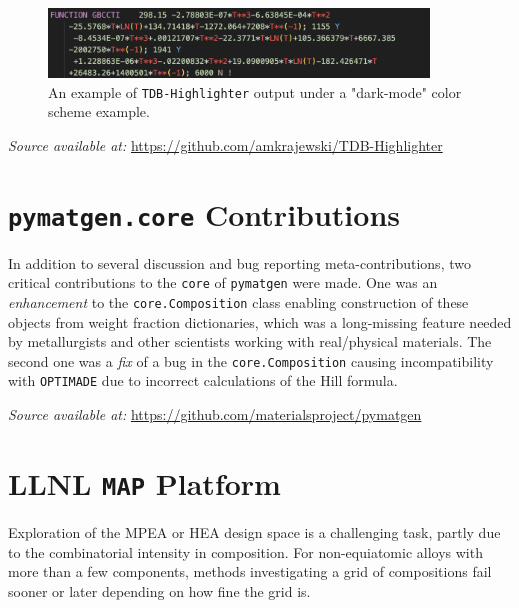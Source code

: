 \begin{figure}[H]
    \centering
    \includegraphics[width=0.9\textwidth]{tangentialsoft/Fig3.png}
    \caption{An example of \texttt{TDB-Highlighter} output under a "dark-mode" color scheme example.}
    \label{osoft:fig:tdbdarkmode}
\end{figure}

\hspace{24pt} 
\textit{Source available at:} 
\href{https://github.com/amkrajewski/TDB-Highlighter}{https://github.com/amkrajewski/TDB-Highlighter}



\section{\texttt{pymatgen.core} Contributions} \label{osoft:sec:pymatgen}

In addition to several discussion and bug reporting meta-contributions, two critical contributions to the \texttt{core} of \texttt{pymatgen} were made. One was an \emph{enhancement} to the \texttt{core.Composition} class enabling construction of these objects from weight fraction dictionaries, which was a long-missing feature needed by metallurgists and other scientists working with real/physical materials. The second one was a \emph{fix} of a bug in the \texttt{core.Composition} causing incompatibility with \texttt{OPTIMADE} due to incorrect calculations of the Hill formula.

\hspace{24pt} 
\textit{Source available at:} 
\href{https://github.com/materialsproject/pymatgen}{https://github.com/materialsproject/pymatgen}


\section{LLNL \texttt{MAP} Platform} \label{osoft:sec:map}

Exploration of the MPEA or HEA design space is a challenging task, partly due to the combinatorial intensity in composition. For non-equiatomic alloys with more than a few components, methods investigating a grid of compositions fail sooner or later depending on how fine the grid is.

